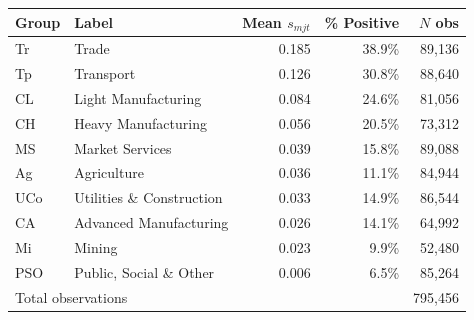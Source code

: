 \begin{tabular}{llrrr}
\toprule
\textbf{Group} & \textbf{Label} & \textbf{Mean $s_{mjt}$} & \textbf{\% Positive} & \textbf{$N$ obs} \\
\midrule

Tr & Trade & 0.185 & 38.9\% & 89,136 \\
Tp & Transport & 0.126 & 30.8\% & 88,640 \\
CL & Light Manufacturing & 0.084 & 24.6\% & 81,056 \\
CH & Heavy Manufacturing & 0.056 & 20.5\% & 73,312 \\
MS & Market Services & 0.039 & 15.8\% & 89,088 \\
Ag & Agriculture & 0.036 & 11.1\% & 84,944 \\
UCo & Utilities \& Construction & 0.033 & 14.9\% & 86,544 \\
CA & Advanced Manufacturing & 0.026 & 14.1\% & 64,992 \\
Mi & Mining & 0.023 & 9.9\% & 52,480 \\
PSO & Public, Social \& Other & 0.006 & 6.5\% & 85,264 \\
\midrule
\multicolumn{4}{l}{Total observations} & 795,456 \\
\bottomrule
\end{tabular}
